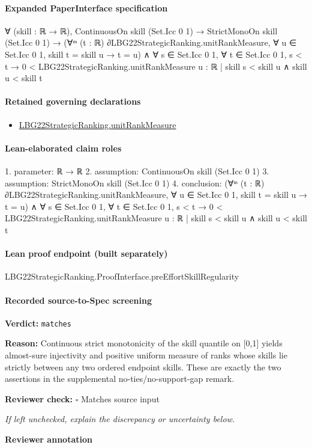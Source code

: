\documentclass[10pt]{article}
\newcommand{\reviewerbox}{%
  \par\noindent\fbox{\parbox{0.96\linewidth}{\rule{0pt}{0.38in}}}\par
}
\newcommand{\reviewmatch}[1]{%
  \par\noindent\textbf{Reviewer check:} $\square$\; #1\par
  \noindent\emph{If left unchecked, explain the discrepancy or uncertainty below.}\par
}
\begin{document}
\paragraph{Expanded PaperInterface specification}
\begin{ReviewVerbatim}
∀ (skill : ℝ → ℝ),
  ContinuousOn skill (Set.Icc 0 1) →
    StrictMonoOn skill (Set.Icc 0 1) →
      (∀ᵐ (t : ℝ) ∂LBG22StrategicRanking.unitRankMeasure, ∀ u ∈ Set.Icc 0 1, skill t = skill u → t = u) ∧
        ∀ s ∈ Set.Icc 0 1,
          ∀ t ∈ Set.Icc 0 1,
            s < t → 0 < LBG22StrategicRanking.unitRankMeasure {u : ℝ | skill s < skill u ∧ skill u < skill t}
\end{ReviewVerbatim}

\paragraph{Retained governing declarations}
\begin{itemize}\raggedright
\item \hyperlink{governing-declaration-678cf48d549cb620}{LBG22\allowbreak{}Strategic\allowbreak{}Ranking.\allowbreak{}unit\allowbreak{}Rank\allowbreak{}Measure}
\end{itemize}
\paragraph{Lean-elaborated claim roles}\begin{ReviewVerbatim}
1. parameter: ℝ → ℝ
2. assumption: ContinuousOn skill (Set.Icc 0 1)
3. assumption: StrictMonoOn skill (Set.Icc 0 1)
4. conclusion: (∀ᵐ (t : ℝ) ∂LBG22StrategicRanking.unitRankMeasure, ∀ u ∈ Set.Icc 0 1, skill t = skill u → t = u) ∧
  ∀ s ∈ Set.Icc 0 1,
    ∀ t ∈ Set.Icc 0 1, s < t → 0 < LBG22StrategicRanking.unitRankMeasure {u : ℝ | skill s < skill u ∧ skill u < skill t}
\end{ReviewVerbatim}

\paragraph{Lean proof endpoint (built separately)}\begin{ReviewVerbatim}
LBG22StrategicRanking.ProofInterface.preEffortSkillRegularity
\end{ReviewVerbatim}

\paragraph{Recorded source-to-Spec screening}
\textbf{Verdict:} \texttt{matches}
\\
{\raggedright
\textbf{Reason:} Continuous strict monotonicity of the skill quantile on [0,1] yields almost-\allowbreak{}sure injectivity and positive uniform measure of ranks whose skills lie strictly between any two ordered endpoint skills.\allowbreak{} These are exactly the two assertions in the supplemental no-\allowbreak{}ties/\allowbreak{}no-\allowbreak{}support-\allowbreak{}gap remark.\allowbreak{}
\par}
\reviewmatch{Matches source input}
\noindent\textbf{Reviewer annotation}\par
\reviewerbox
\end{document}
